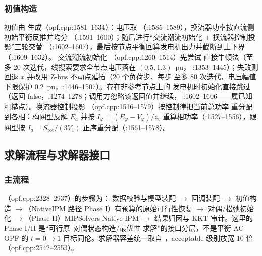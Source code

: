 \subsubsection*{初值构造}
初值由  生成（opf.cpp:1581--1634）：电压取
（:1585--1589），换流器功率按直流侧初始平衡反推并均分
（:1591--1600）；随后进行“交流潮流初始化 + 换流器控制投影”三轮交替
（:1602--1607），最后按节点平衡回算发电机出力并截断到上下界（:1609--1632）。
交流潮流初始化 （opf.cpp:1260--1514）先尝试
直接牛顿法（至多 20 次迭代，线搜索要求全节点电压落在 $(0.5,1.3)$~pu，
:1353--1445）；失败则回退 $x$ 并改用 Z-bus 不动点延拓（20 个负荷步、每步
至多 80 次迭代，电压幅值下限保护 0.2~pu，:1446--1507）。存在非参考节点上的
发电机时初始化直接跳过（返回 false，:1274--1278；调用方忽略该返回值并继续，
:1602--1606——属已知粗糙点）。换流器控制投影
（opf.cpp:1516--1579）按控制律把当前总功率
重分配到各相：构网型反解 $E_a$ 并按 $I_\varphi=(E_\varphi-V_\varphi)/z_v$
重算相功率（:1527--1556），跟网型按 $I_a=\overline{S_{\mathrm{tot}}}/(3V_1)$
正序重分配（:1561--1578）。

\subsection{求解流程与求解器接口}\label{subsec:tp-solve}

\subsubsection*{主流程}
（opf.cpp:2328--2937）的步骤为：
数据校验与模型装配 $\to$  回调装配 $\to$ 初值构造
$\to$（NativeIPM 路径 Phase I）有预算的原始可行性恢复
$\to$ 对偶/松弛初始化 $\to$（Phase II）MIPSolvers Native IPM
$\to$ 结果归因与 KKT 审计。这里的 Phase I/II 是“可行原--对偶状态构造/最优性
求解”的接口分层，不是平衡 AC OPF 的 $t=0\to1$ 目标同伦。求解器容差统一取自
，acceptable 级别放宽 10 倍（opf.cpp:2542--2553）。

